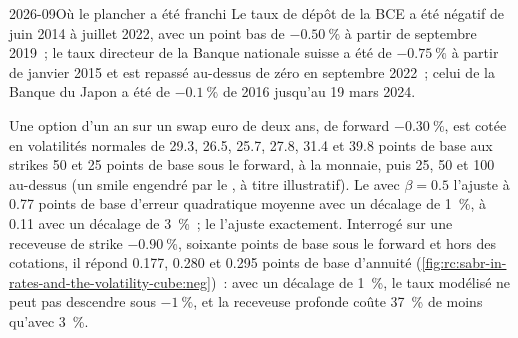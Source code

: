 \begin{dated}{2026-09}{Où le plancher a été franchi}\label{dat:rc:sabr-in-rates-and-the-volatility-cube:elb}
Le taux de dépôt de la BCE a été négatif de juin 2014 à juillet 2022, avec un point bas
de $-0.50~\%$ à partir de septembre 2019~; le taux directeur de la Banque nationale suisse
a été de $-0.75~\%$ à partir de janvier 2015 et est repassé au-dessus de zéro en septembre 2022~; celui de la Banque du Japon
a été de $-0.1~\%$ de 2016 jusqu'au 19 mars 2024.
\end{dated}

\begin{example}\label{ex:rc:sabr-in-rates-and-the-volatility-cube:neg}
Une option d'un an sur un swap euro de deux ans, de forward $-0.30~\%$, est cotée en
volatilités normales de 29.3, 26.5, 25.7, 27.8, 31.4 et 39.8 points de base aux
strikes 50 et 25 points de base sous le forward, à la monnaie, puis 25, 50 et
100 au-dessus (un smile engendré par le , à titre illustratif). Le  avec $\beta=0.5$
l'ajuste à 0.77 points de base d'erreur quadratique moyenne avec un décalage de
1~\%, à 0.11 avec un décalage de 3~\%~; le  l'ajuste exactement. Interrogé
sur une receveuse de strike $-0.90~\%$, soixante points de base sous le forward et hors des
cotations, il répond 0.177, 0.280 et 0.295 points de base d'annuité
(\cref{fig:rc:sabr-in-rates-and-the-volatility-cube:neg})~: avec un décalage de 1~\%, le
taux modélisé ne peut pas descendre sous $-1~\%$, et la receveuse profonde coûte 37~\% de
moins qu'avec 3~\%.
\end{example}

